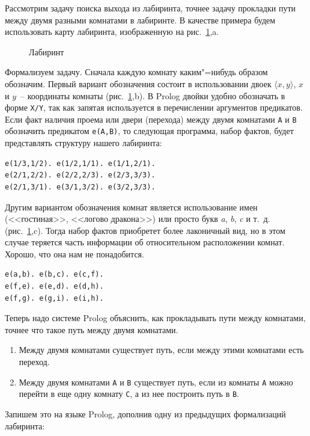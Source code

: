 \documentclass[a4paper,14pt, openany, twoside, final]{extbook} %
\begin{document}
Рассмотрим задачу поиска выхода из лабиринта, точнее задачу прокладки пути между двумя разными комнатами в лабиринте.  В качестве примера будем использовать карту лабиринта, изображенную на рис.~\ref{fig:labyrinth},a.
\begin{figure}[hbt]
  \centering
  \def\svgwidth{\columnwidth} %
  \itshape\small
  \def\svgwidth{\columnwidth}
  
  \caption{Лабиринт}
  \label{fig:labyrinth}
\end{figure}

Формализуем задачу.  Сначала каждую комнату каким"=нибудь образом обозначим.  Первый вариант обозначения состоит в использовании двоек $\langle x,y\rangle$, $x$ и $y$~-- координаты комнаты (рис.~\ref{fig:labyrinth},b).  В Prolog двойки удобно обозначать в форме \texttt{X/Y}, так как запятая используется в перечислении аргументов предикатов.  Если факт наличия проема или двери (перехода) между двумя комнатами \texttt{A} и \texttt{B} обозначить предикатом \texttt{e(A,B)}, то следующая программа, набор фактов, будет представлять структуру нашего лабиринта:

\begin{verbatim}
e(1/3,1/2). e(1/2,1/1). e(1/1,2/1).
e(2/1,2/2). e(2/2,2/3). e(2/3,3/3).
e(2/1,3/1). e(3/1,3/2). e(3/2,3/3).
\end{verbatim}

Другим вариантом обозначения комнат является использование имен (<<гостиная>>, <<логово дракона>>) или просто букв \textit{a}, \textit{b}, \textit{c} и т.~д. (рис.~\ref{fig:labyrinth},c).  Тогда набор фактов приобретет более лаконичный вид, но в этом случае теряется часть информации об относительном расположении комнат.  Хорошо, что она нам не понадобится.

\begin{verbatim}
e(a,b). e(b,c). e(c,f).
e(f,e). e(e,d). e(d,h).
e(f,g). e(g,i). e(i,h).
\end{verbatim}

Теперь надо системе Prolog объяснить, как прокладывать пути между комнатами, точнее что такое путь между двумя комнатами.
\begin{enumerate}
\item Между двумя комнатами существует путь, если между этими комнатами есть переход.
\item Между двумя комнатами \texttt{A} и \texttt{B} существует путь, если из комнаты \texttt{A} можно перейти в еще одну комнату \texttt{C}, а из нее построить путь в \texttt{B}.
\end{enumerate}
Запишем это на языке Prolog, дополнив одну из предыдущих формализаций лабиринта:
\end{document}
